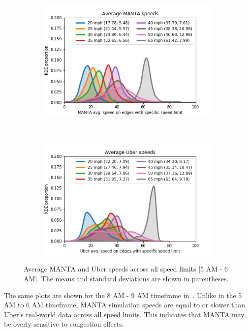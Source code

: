 \documentclass[final]{IEEEtran}
\begin{document}
\begin{figure}
    \centering
    \begin{subfigure}{\linewidth}
        \includegraphics[width=\linewidth]{figs/green_lights_5to6/avg_MANTA_speeds.png}
    \end{subfigure}\\
    \begin{subfigure}{\linewidth}
        \includegraphics[width=\linewidth]{figs/green_lights_5to6/avg_uber_speeds.png}
    \end{subfigure}
    \caption{Average MANTA and Uber speeds across all speed limits [5 AM - 6 AM]. The means and standard deviations are shown in parentheses.}
    \label{fig:avg_microsim_vs_uber_5to6}
\end{figure}

The same plots are shown for the 8 AM - 9 AM timeframe in~. Unlike in the 5 AM to 6 AM timeframe, MANTA simulation speeds are equal to or slower than Uber's real-world data across all speed limits. This indicates that MANTA may be overly sensitive to congestion effects.
\end{document}
